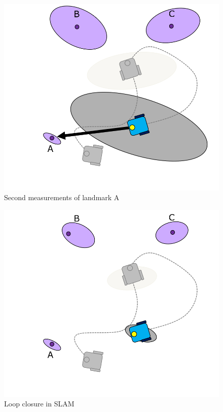 \begin{exmp}
\begin{figure}
\centering
\includegraphics[scale=0.3]{./images/slam_example8}
\caption{Second measurements of landmark A}
\label{slam_example8}
\end{figure} 

\begin{figure}
\centering
\includegraphics[scale=0.3]{./images/slam_example9}
\caption{Loop closure in SLAM}
\label{slam_example9}
\end{figure}
\label{slam_exmp}  
\end{exmp}

